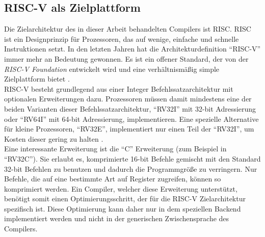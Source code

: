 \subsection{RISC-V als Zielplattform}

Die Zielarchitektur des in dieser Arbeit behandelten Compilers ist \acs{RISC}.
RISC ist ein Designprinzip für Prozessoren, das auf wenige, einfache und schnelle Instruktionen setzt.
In den letzten Jahren hat die Architekturdefinition ``RISC-V'' immer mehr an Bedeutung gewonnen.
Es ist ein offener Standard, der von der \textit{RISC-V Foundation} entwickelt wird und eine verhältnismäßig simple Zielplattform bietet \cite{RISCV}.\\

RISC-V besteht grundlegend aus einer Integer Befehlssatzarchitektur mit optionalen Erweiterungen dazu.
Prozessoren müssen damit mindestens eine der beiden Varianten dieser Befehlssatzarchitektur, ``RV32I'' mit 32-bit Adressierung oder ``RV64I'' mit 64-bit Adressierung, implementieren.
Eine spezielle Alternative für kleine Prozessoren, ``RV32E'', implementiert nur einen Teil der ``RV32I'', um Kosten dieser gering zu halten \cite{waterman:2017}.\\
Eine interessante Erweiterung ist die ``C'' Erweiterung (zum Beispiel in ``RV32C'').
Sie erlaubt es, komprimierte 16-bit Befehle gemischt mit den Standard 32-bit Befehlen zu benutzen und dadurch die Programmgröße zu verringern.
Nur Befehle, die auf eine bestimmte Art auf Register zugreifen, können so komprimiert werden.
Ein Compiler, welcher diese Erweiterung unterstützt, benötigt somit einen Optimierungsschritt, der für die RISC-V Zielarchitektur spezifisch ist.
Diese Optimierung kann daher nur in dem speziellen Backend implementiert werden und nicht in der generischen Zwischensprache des Compilers.
